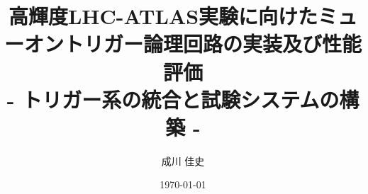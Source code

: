 \title{高輝度LHC-ATLAS実験に向けたミューオントリガー論理回路の実装及び性能評価\\- トリガー系の統合と試験システムの構築 -
} %
\date{\today} %
\author{成川 佳史} %
\seifuku{} %
